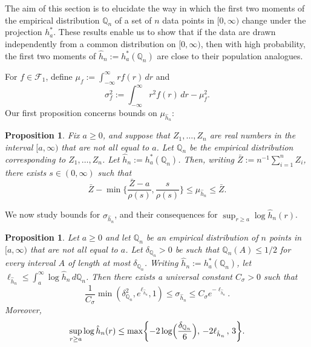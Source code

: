 \documentclass[a4paper,12pt]{article}
\newtheorem{proposition}[theorem]{Proposition}
\begin{document}
The aim of this section is to elucidate the way in which the first two moments of the empirical distribution $\mathbb{Q}_n$ of a set of $n$ data points in $[0,\infty)$ change under the projection $h_a^*$.  These results enable us to show that if the data are drawn independently from a common distribution on $[0,\infty)$, then with high probability, the first two moments of $\hat{h}_n := h_a^*(\mathbb{Q}_n)$ are close to their population analogues.

For $f \in \mathcal{F}_1$, define $\mu_f := \int_{-\infty}^\infty rf(r) \, dr$ and 
\[
\sigma_f^2 := \int_{-\infty}^\infty r^2 f(r) \, dr - \mu_f^2.
\]
Our first proposition concerns bounds on $\mu_{\hat{h}_n}$:
\begin{proposition}
  \label{Prop:MLEMeanPreservation}
Fix $a \geq 0$, and suppose that $Z_1,\ldots,Z_n$ are real numbers in the interval $[a,\infty)$ that are not all equal to $a$.  Let $\mathbb{Q}_n$ be the empirical distribution corresponding to $Z_1,\ldots,Z_n$.  Let $\hat{h}_n := h_{a}^*(\mathbb{Q}_n)$. Then, writing $\bar{Z} := n^{-1}\sum_{i=1}^n Z_i$, there exists $s \in (0, \infty)$ such that
\[
\bar{Z}  - \min \biggl\{ \frac{\bar{Z} - a}{\rho(s)}, \frac{s}{\rho(s)} \biggr\}  \leq \mu_{\hat{h}_n} \leq \bar{Z}.
\]
\end{proposition}
We now study bounds for $\sigma_{\hat{h}_n}$, and their consequences for $\sup_{r \geq a} \log \hat{h}_n(r)$.  
\begin{proposition}
  \label{Prop:MLEVarPreservation}
  Let $a \geq 0$ and let $\mathbb{Q}_n$ be an empirical distribution of $n$ points in $[a,\infty)$ that are not all equal to $a$.  Let $\delta_{\mathbb{Q}_n} > 0$ be such that $\mathbb{Q}_n(A) \leq 1/2$ for every interval $A$ of length at most $\delta_{\mathbb{Q}_n}$.  Writing $\hat{h}_n := h_{a}^*(\mathbb{Q}_n)$, let $\ell_{\hat{h}_n} \leq \int_{a}^\infty \log \hat{h}_n \, d\mathbb{Q}_n$.  Then there exists a universal constant $C_{\sigma} > 0$ such that
  \[
 \frac{1}{C_\sigma} \min(\delta_{\mathbb{Q}_n}^2, e^{\ell_{\hat{h}_n}},1) \leq \sigma_{\hat{h}_n} \leq C_\sigma e^{-\ell_{\hat{h}_n}}.
  \]
Moreover,
  \begin{equation}
\label{Eq:Sup}
    \sup_{r \geq a} \log \hat{h}_n(r) \leq  \max \biggl\{- 2 \log \Bigl( \frac{\delta_{\mathbb{Q}_n} }{6} \Bigr),\,
      - 2 \ell_{\hat{h}_n} \, , \, 3\biggr\}.
  \end{equation}
\end{proposition}
\end{document}
